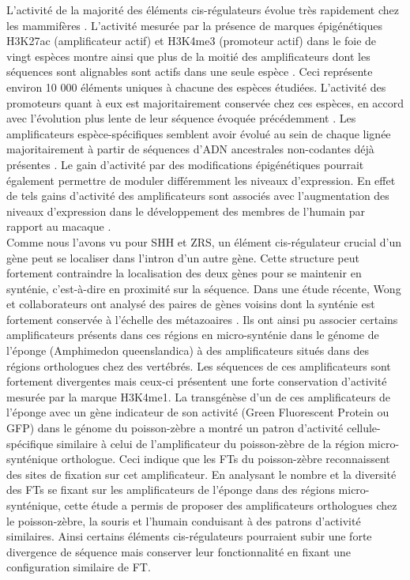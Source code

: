 L’activité de la majorité des éléments \gls{cis}-régulateurs évolue très rapidement chez les mammifères \citep{xiao_comparative_2012, cotney_evolution_2013, villar_enhancer_2015}. L’activité mesurée par la présence de marques épigénétiques H3K27ac (\gls{amplificateur} actif) et H3K4me3 (promoteur actif) dans le foie de vingt espèces montre ainsi que plus de la moitié des \glspl{amplificateur} dont les séquences sont alignables sont actifs dans une seule espèce \citep{villar_enhancer_2015}. Ceci représente environ 10 000 éléments uniques à chacune des espèces étudiées. L’activité des promoteurs quant à eux est majoritairement conservée chez ces espèces, en accord avec l’évolution plus lente de leur séquence évoquée précédemment \citep{cheng_principles_2014}. Les \glspl{amplificateur} espèce-spécifiques semblent avoir évolué au sein de chaque lignée majoritairement à partir de séquences d’ADN ancestrales non-codantes déjà présentes \citep{villar_enhancer_2015}. Le gain d’activité par des modifications épigénétiques pourrait également permettre de moduler différemment les niveaux d’expression. En effet de tels gains d’activité des \glspl{amplificateur} sont associés avec l’augmentation des niveaux d’expression dans le développement des membres de l’humain par rapport au macaque \citep{cotney_evolution_2013}. \\

Comme nous l’avons vu pour \acrshort{SHH} et \acrshort{ZRS}, un élément \gls{cis}-régulateur crucial d’un gène peut se localiser dans l’intron d’un autre gène. Cette structure peut fortement contraindre la localisation des deux gènes pour se maintenir en synténie, c'est-à-dire en proximité sur la séquence. Dans une étude récente, Wong et collaborateurs ont analysé des paires de gènes voisins dont la synténie est fortement conservée à l’échelle des métazoaires \citep{wong_deep_2020}. Ils ont ainsi pu associer certains \glspl{amplificateur} présents dans ces régions en micro-synténie dans le génome de l’éponge (Amphimedon queenslandica) à des \glspl{amplificateur} situés dans des régions orthologues chez des vertébrés. Les séquences de ces \glspl{amplificateur} sont fortement divergentes mais ceux-ci présentent une forte conservation d’activité mesurée par la marque H3K4me1. La transgénèse d’un de ces \glspl{amplificateur} de l’éponge avec un gène indicateur de son activité (Green Fluorescent Protein ou \acrshort{GFP}) dans le génome du poisson-zèbre a montré un patron d’activité cellule-spécifique similaire à celui de l’\gls{amplificateur} du poisson-zèbre de la région micro-synténique orthologue. Ceci indique que les \acrshort{FT}s du poisson-zèbre reconnaissent des sites de fixation sur cet \gls{amplificateur}. En analysant le nombre et la diversité des \acrshort{FT}s se fixant sur les \glspl{amplificateur} de l’éponge dans des régions micro-synténique, cette étude a permis de proposer des \glspl{amplificateur} orthologues chez le poisson-zèbre, la souris et l’humain conduisant à des patrons d’activité similaires. Ainsi certains éléments \gls{cis}-régulateurs pourraient subir une forte divergence de séquence mais conserver leur fonctionnalité en fixant une configuration similaire de \acrshort{FT}.

